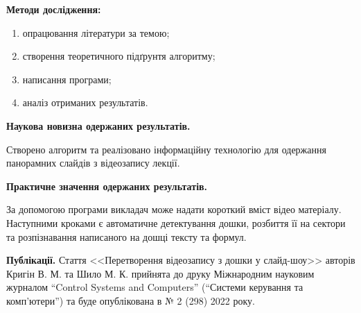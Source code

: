 \textbf{Методи дослідження:}
\begin{enumerate}
      \item опрацювання літератури за темою;
      \item створення теоретичного підґрунтя алгоритму;
      \item написання програми;
      \item аналіз отриманих результатів.
\end{enumerate}

\textbf{Наукова новизна одержаних результатів.}

Створено алгоритм та реалізовано інформаційну технологію
для одержання панорамних слайдів з відеозапису лекції.

\textbf{Практичне значення одержаних результатів.}

За допомогою програми викладач може надати короткий вміст
відео матеріалу. Наступними кроками є автоматичне детектування
дошки, розбиття її на сектори та розпізнавання написаного на
дошці тексту та формул.

\textbf{Публікації.}
Стаття <<Перетворення відеозапису з дошки у слайд-шоу>> авторів 
Кригін В. М. та Шило М. К. прийнята до друку 
Міжнародним науковим журналом “Control Systems and Computers”
(“Системи керування та комп'ютери”) та буде опублікована в № 2 (298) 2022 року.

